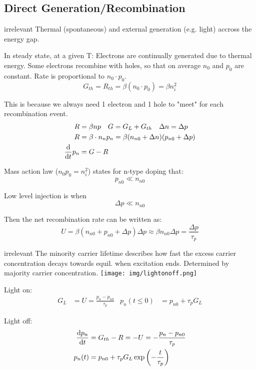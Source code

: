 \documentclass[a4paper, fontsize=8pt, landscape, DIV=1]{scrartcl}
\newcommand{\makeultracompact}{irrelevant}
\begin{document}
\begin{multicols*}{4}
  \subsection{Direct Generation/Recombination}

    \ifdefined\makeultracompact\else
      Thermal (spontaneous) and external generation (e.g. light) accross the energy gap.

      In steady state, at a given T: Electrons are continually generated due to thermal energy.
      Some electrons recombine with holes, so that on average $n_0$ and $p_0$ are constant. 
      Rate is proportional to $n_0 \cdot p_0$. 
    \fi
    \[G_{th} = R_{th} = \beta(n_0 \cdot p_0) = \beta n_i^2\]

    This is because we always need 1 electron and 1 hole to "meet" for each recombination event.
    \begin{align*}
      R &= \beta n p \quad G = G_L + G_{th} \quad \Delta n = \Delta p\\
      R &= \beta\cdot n_n p_n = \beta(n_{n0}+\Delta n)(p_{n0} + \Delta p)  \\
      \frac{\mathrm{d}}{\mathrm{d}t}p_n &= G-R
    \end{align*}

    Mass action law ($n_0p_0=n_i^2$) states for n-type doping that:
    \[p_{n0} \ll n_{n0}\]

    Low level injection is when
    \[\Delta p \ll n_{n0}\]

    Then the net recombination rate can be written as:
    \[U = \beta(n_{n0}+p_{n0}+\Delta p)\Delta p \approx \beta n_{n0}\Delta p = \frac{\Delta p}{\tau_p}\]

    \ifdefined\makeultracompact\else
      The minority carrier lifetime describes how fast the excess carrier concentration decays towards equil. when excitation ends. 
      Determined by majority carrier concentration.
    \fi
    \texttt{[image: img/lightonoff.png]}

    Light on:
    \begin{align*}
      G_L &= U = \frac{p_n-p_{n0}}{\tau_p} & p_n(t \leq 0) &= p_{n0} + \tau_pG_L
    \end{align*}

    Light off:
    \begin{align*}
      \frac{\mathrm{d}p_n}{\mathrm{d}t} &= G_{th} - R = -U = -\frac{p_n-p_{n0}}{\tau_p} \\
      p_n(t) &= p_{n0} + \tau_p G_L \exp\left(-\frac{t}{\tau_p}\right)
    \end{align*}


\end{multicols*}
\end{document}

